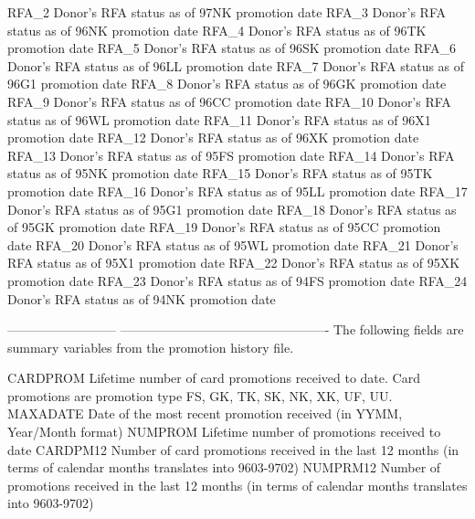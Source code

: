 \documentclass[
  11pt,
  a4paper,
  DIV=12,captions=tableheading,oneside,titlepage]{scrbook}
\let\oldverbatim\verbatim
\let\endoldverbatim\endverbatim
\renewenvironment{verbatim}{\footnotesize\oldverbatim}{\endoldverbatim}
\begin{document}
\begin{verbatim}
RFA_2                       Donor's RFA status as of 97NK promotion date 
RFA_3                       Donor's RFA status as of 96NK promotion date  
RFA_4                       Donor's RFA status as of 96TK promotion date  
RFA_5                       Donor's RFA status as of 96SK promotion date  
RFA_6                       Donor's RFA status as of 96LL promotion date  
RFA_7                       Donor's RFA status as of 96G1 promotion date  
RFA_8                       Donor's RFA status as of 96GK promotion date  
RFA_9                       Donor's RFA status as of 96CC promotion date  
RFA_10                      Donor's RFA status as of 96WL promotion date 
RFA_11                      Donor's RFA status as of 96X1 promotion date 
RFA_12                      Donor's RFA status as of 96XK promotion date 
RFA_13                      Donor's RFA status as of 95FS promotion date 
RFA_14                      Donor's RFA status as of 95NK promotion date 
RFA_15                      Donor's RFA status as of 95TK promotion date 
RFA_16                      Donor's RFA status as of 95LL promotion date 
RFA_17                      Donor's RFA status as of 95G1 promotion date 
RFA_18                      Donor's RFA status as of 95GK promotion date 
RFA_19                      Donor's RFA status as of 95CC promotion date 
RFA_20                      Donor's RFA status as of 95WL promotion date 
RFA_21                      Donor's RFA status as of 95X1 promotion date 
RFA_22                      Donor's RFA status as of 95XK promotion date 
RFA_23                      Donor's RFA status as of 94FS promotion date 
RFA_24                      Donor's RFA status as of 94NK promotion date 

--------------------------  -------------------------------------------------
                            The following fields are summary variables from
                            the promotion history file. 

CARDPROM                    Lifetime number of card promotions received to 
                            date. Card promotions are promotion type FS, GK,
                            TK, SK, NK, XK, UF, UU.
MAXADATE                    Date of the most recent promotion received (in
                            YYMM, Year/Month format)
NUMPROM                     Lifetime number of promotions received to date
CARDPM12                    Number of card promotions received in the last
                            12 months (in terms of calendar months translates 
                            into 9603-9702) 
NUMPRM12                    Number of promotions received in the last 12
                            months (in terms of calendar months translates 
                            into 9603-9702)


\end{verbatim}
\end{document}
